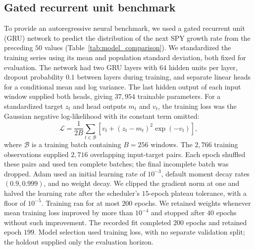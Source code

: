 \subsection{Gated recurrent unit benchmark}
\label{sec:supp-gru}

To provide an autoregressive neural benchmark, we used a gated
recurrent unit (GRU) network to predict the distribution of the next
SPY growth rate from the preceding $50$ values
(Table~\ref{tab:model_comparison}). We standardized the training
series using its mean and population standard deviation, both fixed
for evaluation. The network had two GRU layers with $64$ hidden
units per layer, dropout probability $0.1$ between layers during
training, and separate linear heads for a conditional mean and
log variance. The last hidden output of each input window supplied
both heads, giving $37{,}954$ trainable parameters. For a standardized
target $z_t$ and head outputs $m_t$ and $v_t$, the training loss was
the Gaussian negative log-likelihood with its constant term omitted:
\begin{equation}
 \mathcal L=\frac{1}{2B}\sum_{t\in\mathcal B}
       \left[v_t+(z_t-m_t)^2\exp(-v_t)\right],
 \label{eq:gru-loss}
\end{equation}
where $\mathcal B$ is a training batch containing $B=256$ windows.
The $2{,}766$ training observations supplied $2{,}716$ overlapping
input-target pairs. Each epoch shuffled these pairs and used ten
complete batches; the final incomplete batch was dropped. Adam
used an initial learning rate of $10^{-3}$, default moment decay
rates $(0.9,0.999)$, and no weight decay. We clipped the gradient
norm at one and halved the learning rate after the scheduler's
$15$-epoch plateau tolerance, with a floor of $10^{-5}$. Training
ran for at most $200$ epochs. We retained weights whenever mean
training loss improved by more than $10^{-4}$ and stopped after
$40$ epochs without such improvement. The recorded fit completed
$200$ epochs and retained epoch $199$. Model selection used training
loss, with no separate validation split; the holdout supplied only
the evaluation horizon.

